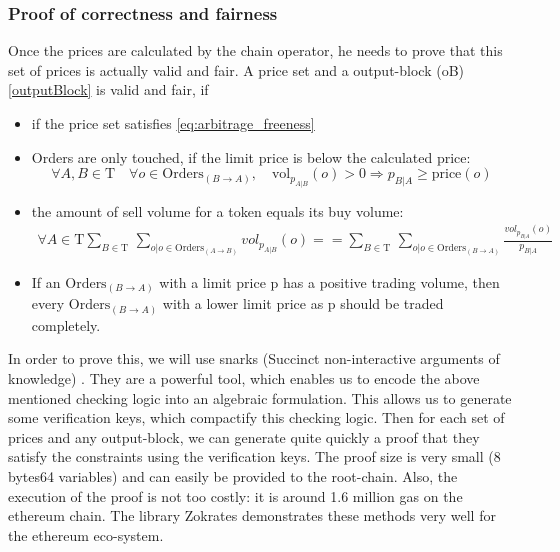 \documentclass[11pt,parskip=full]{scrartcl}%
\newcommand{\Tau}{\mathrm{T}}
\begin{document}
\subsubsection{Proof of correctness and fairness}
Once the prices are calculated by the chain operator, he needs to prove that this set of prices is actually valid and fair. A price set and a output-block (oB) \ref{outputBlock} is valid and fair, if
\begin{itemize}

\item if the price set satisfies \ref{eq:arbitrage_freeness} 
\item Orders are only touched, if the limit price is below the calculated price:\newline
\begin{equation} \forall A,B \in \Tau \quad \forall o \in \text{Orders}_{(B\rightarrow A)}, \quad \text{vol}_{p_{A|B}}(o)>0 \Rightarrow p_{B|A}\geq \text{price}(o)
\end{equation}
\item the amount of sell volume for a token equals its buy volume: 
\begin{equation}
\begin{split}
\forall A \in \Tau \sum_{B\in \Tau} \,
\sum_{o| o\in \text{Orders}_{(A\rightarrow B)}} vol_{p_{A|B}}(o) == \sum_{B\in \Tau} \, \sum_{o| o\in \text{Orders}_{(B\rightarrow A)}} \frac{vol_{p_{B|A}}(o)}{p_{B|A}}
\end{split}
\end{equation}
\item If an $\text{Orders}_{(B\rightarrow A)}$ with a limit price p has a positive trading volume, then every $\text{Orders}_{(B\rightarrow A)}$ with a lower limit price as p should be traded completely.
\end{itemize}

In order to prove this, we will use snarks (Succinct non-interactive arguments of knowledge) \cite{snarks}. They are a powerful tool, which enables us to encode the above mentioned checking logic into an algebraic formulation. This allows us to generate some verification keys, which compactify this checking logic. Then for each set of prices and any output-block, we can generate quite quickly a proof that they satisfy the constraints using the verification keys. The proof size is very small (8 bytes64 variables) and can easily be provided to the root-chain. Also, the execution of the proof is not too costly: it is around 1.6 million gas on the ethereum chain. The library Zokrates demonstrates these methods very well for the ethereum eco-system.
\end{document}
